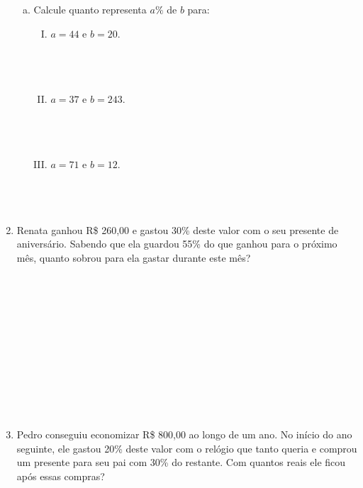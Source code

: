 \documentclass[a4paper,14pt]{article}
\begin{document}
\begin{multicols}{2}
\begin{enumerate}
\begin{enumerate}[a)]
				\item Calcule quanto representa $a\%$ de $b$ para:
				\begin{enumerate}[I.] 
					\item $a = 44$ e $b = 20$. \\\\\\\\
					\item $a = 37$ e $b = 243$. \\\\\\\\
					\item $a = 71$ e $b = 12$. \\\\\\\\
				\end{enumerate}
			\end{enumerate}
			\item Renata ganhou R\$ 260,00 e gastou 30\% deste valor com o seu presente de aniversário. Sabendo que ela guardou 55\% do que ganhou para o próximo mês, quanto sobrou para ela gastar durante este mês? \\\\\\\\\\\\\\\\\\\\\\\\
			\item Pedro conseguiu economizar R\$ 800,00 ao longo de um ano. No início do ano seguinte, ele gastou 20\% deste valor com o relógio que tanto queria e comprou um presente para seu pai com 30\% do restante. Com quantos reais ele ficou após essas compras? \\\\\\\\\\\\\\\\\\\\\\\\\\

\end{enumerate}
\end{multicols}
\end{document}
